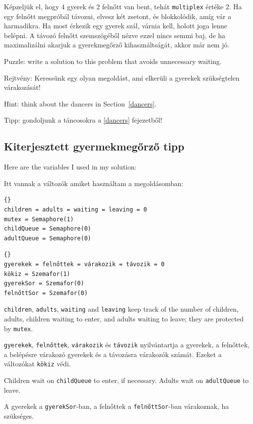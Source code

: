 \documentclass{book}
\newcommand{\clearemptydoublepage}{\newpage\cleardoublepage}
\begin{document}
Képzeljük el, hogy 4 gyerek és 2 felnőtt van bent, tehát {\tt multiplex}
értéke 2. Ha egy felnőtt megpróbál távozni, elvesz két zsetont, és
blokkolódik, amíg vár a harmadikra. Ha most érkezik egy gyerek szál,
várnia kell, holott joga lenne belépni. A távozó felnőtt szemszögéből
nézve ezzel nincs semmi baj, de ha maximalizálni akarjuk a gyerekmegőrző
kihasználtságát, akkor már nem jó.

Puzzle: write a solution to this problem that avoids unnecessary
waiting.

Rejtvény: Keressünk egy olyan megoldást, ami elkerüli a gyerekek
szükségtelen várakozását!

Hint: think about the dancers in Section~\ref{dancers}.

Tipp: gondoljunk a táncosokra a \ref{dancers} fejezetből!

\clearemptydoublepage
\subsection{Kiterjesztett gyermekmegőrző tipp}

Here are the variables I used in my solution:

Itt vannak a változók amiket használtam a
megoldásomban:

\begin{lstlisting}[title={Extended child care hint}]{}
children = adults = waiting = leaving = 0
mutex = Semaphore(1)
childQueue = Semaphore(0)
adultQueue = Semaphore(0)
\end{lstlisting}

\begin{lstlisting}[title={Kiterjesztett gyermekmegőrző tipp}]{}
gyerekek = felnőttek = várakozik = távozik = 0
kökiz = Szemafor(1)
gyerekSor = Szemafor(0)
felnőttSor = Szemafor(0)
\end{lstlisting}


{\tt children}, {\tt adults}, {\tt waiting} and {\tt leaving}
keep track of the number of children, adults, children waiting
to enter, and adults waiting to leave; they are protected by
{\tt mutex}.

{\tt gyerekek}, {\tt felnőttek}, {\tt várakozik} és {\tt távozik}
nyilvántartja a gyerekek, a felnőttek, a belépésre várakozó gyerekek
és a távozásra várakozók számát. Ezeket a változókat {\tt kökiz} védi.

Children wait on {\tt childQueue} to enter, if necessary.
Adults wait on {\tt adultQueue} to leave.

A gyerekek a {\tt gyerekSor}-ban, a felnőttek a {\tt felnőttSor}-ban
várakoznak, ha szükséges.
\end{document}
